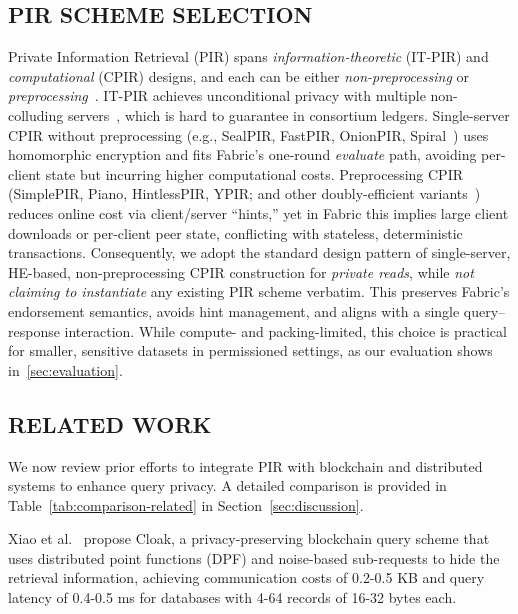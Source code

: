 \documentclass{ieeetj}
\begin{document}
\subsection{PIR SCHEME SELECTION}
Private Information Retrieval (PIR) spans \emph{information-theoretic} (IT-PIR) and \emph{computational} (CPIR) designs, 
and each can be either \emph{non-preprocessing} or \emph{preprocessing}~\cite{chor_private_1998}. IT-PIR achieves unconditional 
privacy with multiple non-colluding servers~\cite{goldberg_improving_2007,beimel_breaking_2002,devet_optimally_2012,demmler_raid-pir_2014}, 
which is hard to guarantee in consortium ledgers. Single-server CPIR without preprocessing (e.g., SealPIR, FastPIR, OnionPIR, 
Spiral~\cite{sealpir_2018,fastpir_2021,onionpir_2021,spiral_2022}) uses homomorphic encryption and fits Fabric’s one-round \emph{evaluate} 
path, avoiding per-client state but incurring higher computational costs. Preprocessing CPIR (SimplePIR, Piano, HintlessPIR, YPIR; and other 
doubly-efficient variants~\cite{beimel_reducing_2004,simplepir_2023,piano_pir_2024,hintless_pir_2024,ypir_2024,depir_ring_lwe_2023,okada_towards_depir_2025,corrigan-gibbs_subpir_2020}) 
reduces online cost via client/server ``hints,'' yet in Fabric this implies large client downloads or per-client peer state, conflicting 
with stateless, deterministic transactions. Consequently, we adopt the standard design pattern of single-server, HE-based, 
non-preprocessing CPIR construction for \emph{private reads}, while \emph{not claiming to instantiate} any existing PIR scheme verbatim. 
This preserves Fabric’s endorsement semantics, avoids hint management, and aligns with a single query–response 
interaction. While compute- and packing-limited, this choice is practical for smaller, sensitive datasets in permissioned settings, 
as our evaluation shows in~\ref{sec:evaluation}.

\subsection{RELATED WORK}
We now review prior efforts to integrate PIR with blockchain and distributed systems to enhance query privacy. 
A detailed comparison is provided in Table~\ref{tab:comparison-related} in Section~\ref{sec:discussion}.

Xiao et al.~\cite{xiao_cloak_2024} propose Cloak, a privacy-preserving blockchain query scheme that uses distributed point functions (DPF) 
and noise-based sub-requests to hide the retrieval information, achieving communication costs of 0.2-0.5 KB and query latency of 0.4-0.5 ms 
for databases with 4-64 records of 16-32 bytes each.
\end{document}
